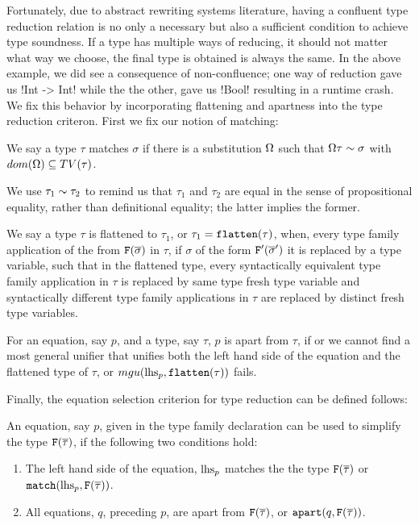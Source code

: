 \documentclass[format=acmsmall,manuscript,review,screen,nonacm,margin=1in,11pt]{acmart}
\begin{document}
Fortunately, due to abstract rewriting systems literature\cite{bezem_term_2003},
having a confluent type reduction relation is no only a necessary but also a sufficient condition
to achieve type soundness. If a type has multiple ways of reducing,
it should not matter what way we choose, the final type is obtained is always the same. %
In the above example, we did see a consequence of non-confluence; one way of reduction
gave us !Int -> Int! while the the other, gave us !Bool! resulting in a runtime crash.
We fix this behavior by incorporating flattening and apartness into the type reduction criteron.
First we fix our notion of matching:
\begin{defn}[Matching]\label{def:ctf-match}
  We say a type $\tau$ matches $\sigma$ if there is a substitution $\Omega$ such that $\Omega\tau \mathrel{\sim} \sigma$ with
  $dom(\Omega) \subseteq TV(\tau)$.
\end{defn}
We use $\tau_1 \mathrel{\sim} \tau_2$ to remind us that $\tau_1$ and $\tau_2$ are equal in the sense
of propositional equality, rather than definitional equality; the latter implies the former.
\begin{defn}\label{def:ctf-flatten}
  We say a type $\tau$ is flattened to $\tau_1$, or $\tau_1 = \texttt{flatten}(\tau)$, when, every
  type family application of the from $\texttt{F}(\overline{\sigma})$ in $\tau$,
  if $\sigma$ of the form $\texttt{F}'(\overline{\sigma}')$ it is replaced by a type variable,
  such that in the flattened type, every syntactically equivalent type family application
  in $\tau$ is replaced by same type fresh type variable
  and syntactically different type family applications in $\tau$ are replaced by distinct fresh type variables.
\end{defn}
\begin{defn}[Apartness]\label{def:ctf-apart}
  For an equation, say $p$, and a type, say $\tau$, $p$ is apart from $\tau$, if 
  or we cannot find a most general unifier that unifies both the left hand side of the equation
  and the flattened type of $\tau$, or $mgu(\text{lhs}_{p},\texttt{flatten}(\tau))$ fails.
\end{defn}
Finally, the equation selection criterion for type reduction can be defined follows:
\begin{defn}\label{def:ctf-simpl-1}
  An equation, say $p$, given in the type family declaration can be used to simplify the type
  $\texttt{F}(\overline{\tau})$, if the following two conditions hold:
  \begin{enumerate}
  \item The left hand side of the equation, $\text{lhs}_{p}$  matches the the type $\texttt{F}(\overline{\tau})$
    or $\texttt{match}(\text{lhs}_{p}, \texttt{F}(\overline{\tau}))$.
  \item All equations, $q$, preceding $p$, are apart from $\texttt{F}(\overline{\tau})$, or
    $\texttt{apart}(q, \texttt{F}(\overline{\tau}))$.
  \end{enumerate}
\end{defn}
\end{document}

